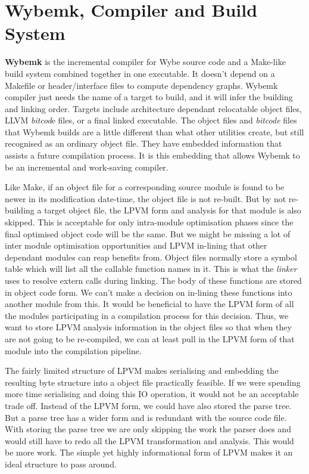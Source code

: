 \chapter{Wybemk, Compiler and Build System}
\label{chap:build_system}

\textbf{Wybemk} is the incremental compiler for Wybe source code and a
Make-like build system combined together in one executable. It doesn't depend
on a Makefile or header/interface files to compute dependency graphs. Wybemk
compiler just needs the name of a target to build, and it will infer the
building and linking order. Targets include architecture dependant relocatable
object files, LLVM \textit{bitcod}e files, or a final linked executable. The
object files and \textit{bitcode} files that Wybemk builds are a little
different than what other utilities create, but still recognised as an ordinary
object file. They have embedded information that assists a future compilation
process. It is this embedding that allows Wybemk to be an incremental and
work-saving compiler.

Like Make, if an object file for a corresponding source module is found to be
newer in its modification date-time, the object file is not re-built. But by
not re-building a target object file, the LPVM form and analysis for that
module is also skipped. This is acceptable for only intra-module optimisation
phases since the final optimised object code will be the same. But we might be
missing a lot of inter module optimisation opportunities and LPVM in-lining
that other dependant modules can reap benefits from. Object files normally
store a symbol table which will list all the callable function names in
it. This is what the \textit{linker} uses to resolve extern calls during
linking. The body of these functions are stored in object code form. We can't
make a decision on in-lining these functions into another module from this. It
would be beneficial to have the LPVM form of all the modules participating in a
compilation process for this decision. Thus, we want to store LPVM analysis
information in the object files so that when they are not going to be
re-compiled, we can at least pull in the LPVM form of that module into the
compilation pipeline.

The fairly limited structure of LPVM makes serialising and embedding the
resulting byte structure into a object file practically feasible. If we were
spending more time serialising and doing this IO operation, it would not be an
acceptable trade off. Instead of the LPVM form, we could have also stored the
parse tree. But a parse tree has a wider form and is redundant with the source
code file. With storing the parse tree we are only skipping the work the parser
does and would still have to redo all the LPVM transformation and
analysis. This would be more work. The simple yet highly informational form of
LPVM makes it an ideal structure to pass around.


